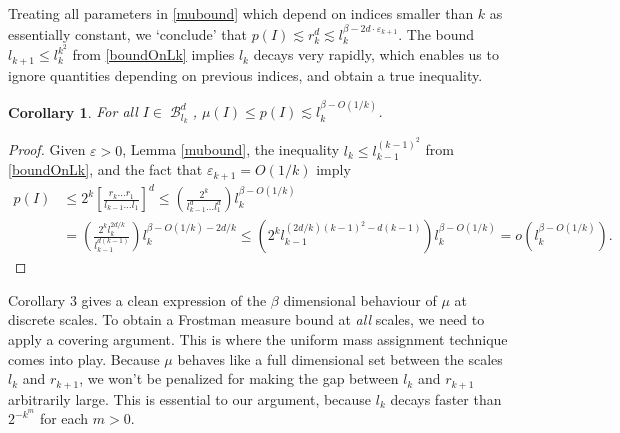 \documentclass[dvipsnames,letterpaper,12pt]{article}
\numberwithin{equation}{section}
\theoremstyle{plain}
\newtheorem{corollary}{Corollary}
\DeclareMathOperator{\B}{\mathcal{B}}
\begin{document}
Treating all parameters in \eqref{mubound} which depend on indices smaller than $k$ as essentially constant, we `conclude' that $p(I) \lesssim r_k^d \lesssim l_k^{\beta - 2d \cdot \varepsilon_{k+1}}$. The bound $l_{k+1} \leq l_k^{k^2}$ from \eqref{boundOnLk} implies $l_k$ decays very rapidly, which enables us to ignore quantities depending on previous indices, and obtain a true inequality.

\begin{corollary}
	For all $I \in \B^d_{l_k}$, $\mu(I) \leq p(I) \lesssim l_k^{\beta - O(1/k)}$.
\end{corollary}
\begin{proof}
	Given $\varepsilon > 0$, Lemma \ref{mubound}, the inequality $l_k \leq l_{k-1}^{(k-1)^2}$ from \eqref{boundOnLk}, and the fact that $\varepsilon_{k+1} = O(1/k)$ imply
	\begin{align*}
		p(I) &\leq 2^k \left[ \frac{r_k \dots r_1}{l_{k-1} \dots l_1} \right]^d \leq \left( \frac{2^k}{l_{k-1}^d \dots l_1^d} \right) l_k^{\beta - O(1/k)}\\
		&= \left( \frac{2^k l_k^{2d/k}}{l_{k-1}^{d(k-1)}} \right) l_k^{\beta - O(1/k) - 2d/k} \leq \left( 2^k l_{k-1}^{(2d/k)(k-1)^2 - d(k-1)} \right) l_k^{\beta - O(1/k)} = o(l_k^{\beta - O(1/k)}). \tag*{\qedhere}
	\end{align*}
\end{proof}

Corollary 3 gives a clean expression of the $\beta$ dimensional behaviour of $\mu$ at discrete scales. To obtain a Frostman measure bound at {\it all} scales, we need to apply a covering argument. This is where the uniform mass assignment technique comes into play. Because $\mu$ behaves like a full dimensional set between the scales $l_k$ and $r_{k+1}$, we won't be penalized for making the gap between $l_k$ and $r_{k+1}$ arbitrarily large. This is essential to our argument, because $l_k$ decays faster than $2^{-k^m}$ for each $m > 0$.
\end{document}
